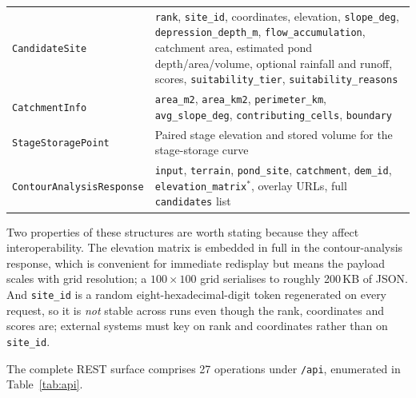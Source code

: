 \documentclass[sigconf,review,10pt]{acmart}
\newcommand{\codelong}[1]{\texttt{#1}}
\begin{document}
\begin{table}[t]
\begin{tabular}{@{}R{4.8cm}R{11.7cm}@{}}
\texttt{CandidateSite} & \texttt{rank}, \texttt{site\_id}, coordinates, elevation, \texttt{slope\_deg}, \texttt{depression\_depth\_m}, \texttt{flow\_accumulation}, catchment area, estimated pond depth/area/volume, optional rainfall and runoff, scores, \texttt{suitability\_tier}, \texttt{suitability\_reasons} \\
\texttt{CatchmentInfo} & \texttt{area\_m2}, \texttt{area\_km2}, \texttt{perimeter\_km}, \texttt{avg\_slope\_deg}, \texttt{contributing\_cells}, \texttt{boundary} \\
\texttt{StageStoragePoint} & Paired stage elevation and stored volume for the stage-storage curve \\
\codelong{ContourAnalysisResponse} & \texttt{input}, \texttt{terrain}, \texttt{pond\_site}, \texttt{catchment}, \texttt{dem\_id}, \texttt{elevation\_matrix}$^{*}$, overlay URLs, full \texttt{candidates} list \\
\bottomrule
\end{tabular}
\end{table}

Two properties of these structures are worth stating because they affect
interoperability. The elevation matrix is embedded in full in the
contour-analysis response, which is convenient for immediate redisplay but
means the payload scales with grid resolution; a $100\times100$ grid
serialises to roughly 200\,KB of JSON. And \texttt{site\_id} is a random
eight-hexadecimal-digit token regenerated on every request, so it is
\emph{not} stable across runs even though the rank, coordinates and scores
are; external systems must key on rank and coordinates rather than on
\texttt{site\_id}.

The complete REST surface comprises 27 operations under \texttt{/api},
enumerated in Table~\ref{tab:api}.
\end{document}
